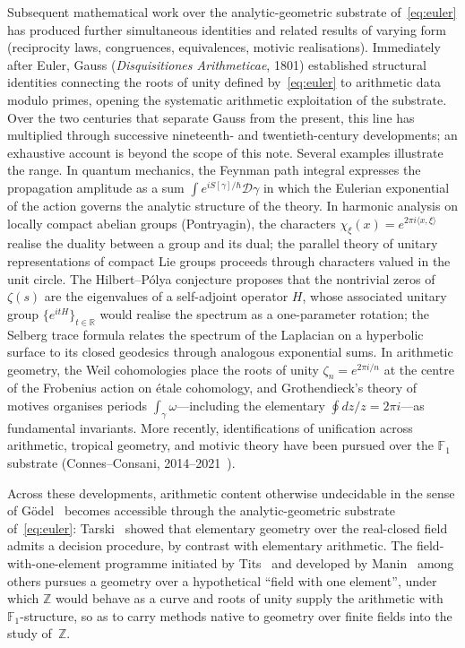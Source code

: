 Subsequent mathematical work over the analytic-geometric substrate
of~\eqref{eq:euler} has produced further simultaneous identities and
related results of varying form (reciprocity laws, congruences,
equivalences, motivic realisations).  Immediately after Euler, Gauss (\emph{Disquisitiones
Arithmeticae}, 1801) established structural identities connecting the
roots of unity defined by~\eqref{eq:euler} to arithmetic data modulo
primes, opening the systematic arithmetic exploitation of the
substrate.  Over the two centuries that separate Gauss from the
present, this line has multiplied through successive
nineteenth- and twentieth-century developments; an exhaustive
account is beyond the scope of this note.  Several examples
illustrate the range.  In quantum mechanics, the Feynman path
integral expresses the propagation amplitude as a sum
$\int e^{iS[\gamma]/\hbar}\mathcal{D}\gamma$ in which the Eulerian
exponential of the action governs the analytic structure of the
theory.  In harmonic analysis on locally compact abelian groups
(Pontryagin), the characters
$\chi_\xi(x)=e^{2\pi i\langle x,\xi\rangle}$ realise the duality
between a group and its dual; the parallel theory of unitary
representations of compact Lie groups proceeds through characters
valued in the unit circle.  The Hilbert--Pólya conjecture proposes
that the nontrivial zeros of $\zeta(s)$ are the eigenvalues of a
self-adjoint operator $H$, whose associated unitary group
$\{e^{itH}\}_{t\in\mathbb{R}}$ would realise the spectrum as a
one-parameter rotation; the Selberg trace formula relates the
spectrum of the Laplacian on a hyperbolic surface to its closed
geodesics through analogous exponential sums.  In arithmetic
geometry, the Weil cohomologies place the roots of unity
$\zeta_n=e^{2\pi i/n}$ at the centre of the Frobenius action on
étale cohomology, and Grothendieck's theory of motives organises
periods $\int_\gamma\omega$---including the elementary
$\oint dz/z=2\pi i$---as fundamental invariants.  More recently,
identifications of unification across arithmetic, tropical
geometry, and motivic theory have been pursued over the
$\mathbb{F}_{1}$ substrate
(Connes--Consani, 2014--2021~\cite{connes-consani-site}).

Across these developments, arithmetic content otherwise undecidable in
the sense of Gödel~\cite{godel-1931} becomes accessible through the
analytic-geometric substrate of~\eqref{eq:euler}:
Tarski~\cite{tarski-1948} showed that elementary geometry over the
real-closed field admits a decision procedure, by contrast with
elementary arithmetic.  The field-with-one-element programme initiated
by Tits~\cite{tits-1957} and developed by Manin~\cite{manin-1995} among
others pursues a geometry over a hypothetical ``field with one
element'', under which $\mathbb{Z}$ would behave as a curve and roots of
unity supply the arithmetic with $\mathbb{F}_{1}$-structure, so as to
carry methods native to geometry over finite fields into the study
of~$\mathbb{Z}$.

